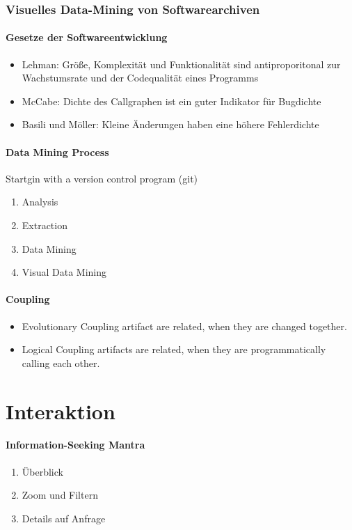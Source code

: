 \documentclass[ngerman]{scrartcl}
\begin{document}
\subsubsection{Visuelles Data-Mining von Softwarearchiven}

\paragraph{Gesetze der Softwareentwicklung}
\begin{itemize}
  \item Lehman: Größe, Komplexität und Funktionalität sind antiproporitonal zur Wachstumsrate und der Codequalität eines Programms
  \item McCabe: Dichte des Callgraphen ist ein guter Indikator für Bugdichte
  \item Basili und Möller: Kleine Änderungen haben eine höhere Fehlerdichte
\end{itemize}

\paragraph{Data Mining Process}
Startgin with a version control program (git)
\begin{enumerate}
  \item Analysis
  \item Extraction
  \item Data Mining
  \item Visual Data Mining
\end{enumerate} 



\paragraph{Coupling}
\begin{itemize}
  \item Evolutionary Coupling artifact are related, when they are changed together.
  \item Logical Coupling artifacts are related, when they are programmatically calling each other.
\end{itemize}


\section{Interaktion} 
\paragraph{Information-Seeking Mantra}
\begin{enumerate}
	\item Überblick
	\item Zoom und Filtern
	\item Details auf Anfrage
\end{enumerate}
\end{document}
